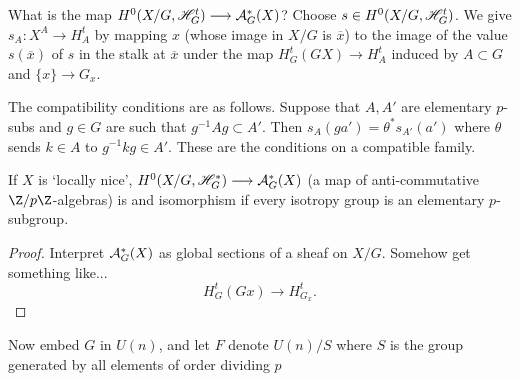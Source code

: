 \documentclass[11pt]{article}
\begin{document}
\begin{JeromyQuillenPractice}
What is the map $H^0(X/G,\mathscr{H}_G^t)\longrightarrow \mathcal{A}_G^*(X)$? Choose $s\in H^0(X/G,\mathscr{H}_G^t)$. We give $s_A:X^A\to H_A^t$ by mapping $x$ (whose image in $X/G$ is $\overline x$) to the image of the value $s(\overline x)$ of $s$ in the stalk at $\overline x$ under the map $H^t_G(GX)\to H^t_A$ induced by $A\subset G$ and $\{x\}\to G_x$.

The compatibility conditions are as follows. Suppose that $A,A'$ are elementary $p$-subs and $g\in G$ are such that $g^{-1}Ag\subset A'$. Then $s_A(ga')=\theta^*s_{A'}(a')$ where $\theta$ sends $k\in A$ to $g^{-1}kg\in A'$. These are the conditions on a compatible family.
\begin{prop*}
If $X$ is `locally nice', $H^0(X/G,\mathscr{H}^*_G)\longrightarrow\mathcal{A}_G^*(X)$ (a map of anti-commutative $\Z/p\Z$-algebras) is and isomorphism if every isotropy group is an elementary $p$-subgroup.
\end{prop*}
\begin{proof}
Interpret $\mathcal{A}_G^*(X)$ as global sections of a sheaf on $X/G$. Somehow get something like...
\[H_G^t(Gx)\to H^t_{G_x}.\]
\end{proof}
Now embed $G$ in $U(n)$, and let $F$ denote $U(n)/S$ where $S$ is the group generated by all elements of order dividing $p$


\pagebreak
\end{JeromyQuillenPractice}
\end{document}
